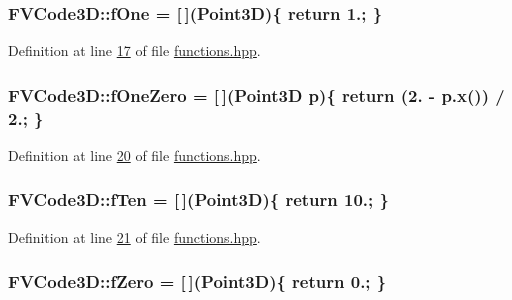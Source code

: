\subsubsection[{\texorpdfstring{f\+One}{fOne}}]{ F\+V\+Code3\+D\+::f\+One = \mbox{[}$\,$\mbox{]}({\bf Point3D})\{ return 1.; \}}\hypertarget{namespaceFVCode3D_a1a9ede09c77441d292a079fbab60fb82}{}\label{namespaceFVCode3D_a1a9ede09c77441d292a079fbab60fb82}


Definition at line \hyperlink{functions_8hpp_source_l00017}{17} of file \hyperlink{functions_8hpp_source}{functions.\+hpp}.

\subsubsection[{\texorpdfstring{f\+One\+Zero}{fOneZero}}]{ F\+V\+Code3\+D\+::f\+One\+Zero = \mbox{[}$\,$\mbox{]}({\bf Point3D} p)\{ return (2. -\/ p.\+x()) / 2.; \}}\hypertarget{namespaceFVCode3D_a05f5ace5c7eed4784717659f36b087fe}{}\label{namespaceFVCode3D_a05f5ace5c7eed4784717659f36b087fe}


Definition at line \hyperlink{functions_8hpp_source_l00020}{20} of file \hyperlink{functions_8hpp_source}{functions.\+hpp}.

\subsubsection[{\texorpdfstring{f\+Ten}{fTen}}]{ F\+V\+Code3\+D\+::f\+Ten = \mbox{[}$\,$\mbox{]}({\bf Point3D})\{ return 10.; \}}\hypertarget{namespaceFVCode3D_ab998dd309f7a549b31ae669513c2039d}{}\label{namespaceFVCode3D_ab998dd309f7a549b31ae669513c2039d}


Definition at line \hyperlink{functions_8hpp_source_l00021}{21} of file \hyperlink{functions_8hpp_source}{functions.\+hpp}.

\subsubsection[{\texorpdfstring{f\+Zero}{fZero}}]{ F\+V\+Code3\+D\+::f\+Zero = \mbox{[}$\,$\mbox{]}({\bf Point3D})\{ return 0.; \}}\hypertarget{namespaceFVCode3D_a2e72cc81c6f214d6e057af7a02599501}{}\label{namespaceFVCode3D_a2e72cc81c6f214d6e057af7a02599501}



